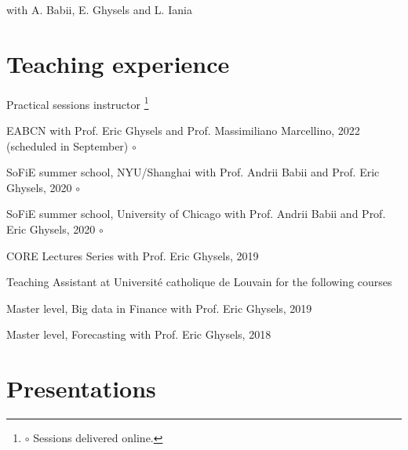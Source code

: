 \documentclass[10pt]{article}
\newcommand\blfootnote[1]{%
	\begingroup
	\renewcommand\thefootnote{}\footnote{#1}%
	\addtocounter{footnote}{-1}%
	\endgroup
}
\newcommand{\thecircle}{{\Large{\color{blue}$\circ$} }}
\newcommand{\thecirclenogap}{{\Large{\color{blue}$\circ$}}}
\begin{document}
	\hspace{2em}{\small(supersedes ``Quantile-based Inﬂation Risk Models'')}
	
	\hspace{2em} with A. Babii, E. Ghysels and L. Iania
	
	
	
	\section*{Teaching experience}
	\vspace{-0.5em}
	
	\hspace{1em} Practical sessions instructor\blfootnote{\thecircle Sessions delivered online.} 
	
	\hspace{2em} EABCN with Prof. Eric Ghysels and Prof. Massimiliano Marcellino, 2022 (scheduled in September) \thecirclenogap
	
	\hspace{2em} SoFiE summer school, NYU/Shanghai with Prof. Andrii Babii and Prof. Eric Ghysels, 2020 \thecirclenogap
	
	\hspace{2em} SoFiE summer school, University of Chicago with Prof. Andrii Babii and Prof. Eric Ghysels, 2020 \thecirclenogap
	
	\hspace{2em} CORE Lectures Series with Prof. Eric Ghysels, 2019
	
	\smallskip
	
	\newpage 
	
	\hspace{1em} Teaching Assistant at Universit\'e catholique de Louvain for the following courses
	
	\hspace{2em} Master level, Big data in Finance with Prof. Eric Ghysels, 2019
	
	\hspace{2em} Master level, Forecasting with Prof. Eric Ghysels, 2018
	
	\section*{Presentations}
	\vspace{-2em}
	
\end{document}
